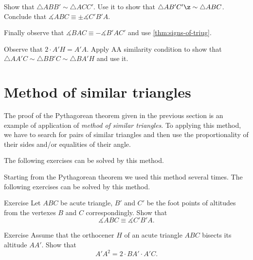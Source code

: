 {
Show that $\triangle ABB'\sim\triangle ACC'$.
Use it to show that $\triangle AB'C'\z\sim\triangle ABC$.
Conclude that $\measuredangle ABC\equiv   \pm\measuredangle C'B'A$.

Finally observe that $\measuredangle BAC\equiv -\measuredangle B'AC'$ and use \ref{thm:signs-of-triug}.


Observe that $2\cdot A'H=A'A$.
Apply AA similarity condition to show that $\triangle AA'C\sim\triangle BB'C \sim\triangle BA'H$  and use it.











\section*{Method of similar triangles}

The proof of the Pythagorean theorem given in the previous section is an example of application of \emph{method of similar triangles}.
To applying this method, we have to search for pairs of similar triangles and then use the proportionality of their sides and/or equalities of their angle.

The following exercises can be solved by this method.

\begin{thm}{Exercise}
Let $ABC$ be acute triangle,
$B'$ and $C'$ be the foot points of $B$ and $C$ on the sides $[AC]$ and ${ 
\end{thm}




Starting from the Pythagorean theorem we used this method several times.
The following exercises can be solved by this method.

\begin{thm}{Exercise}\label{ex:angle-altitude}
Let $ABC$ be acute triangle,
$B'$ and $C'$ be the foot points of altitudes from the vertexes $B$ and $C$ correspondingly.
Show that 
\[\measuredangle ABC\equiv   \measuredangle C'B'A.\]

\end{thm}

\begin{thm}{Exercise}\label{ex:orthocener-bisects}
Assume that the orthocener $H$ of an acute triangle $ABC$ bisects its altitude $AA'$.
Show that 
\[A'A^2=2\cdot BA'\cdot A'C.\]


\end{thm}}
